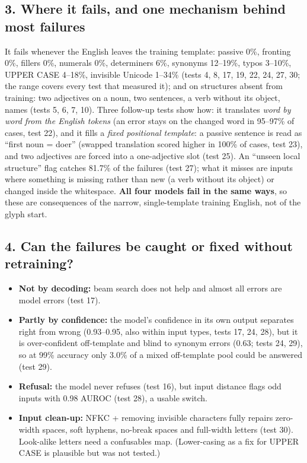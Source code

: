 \documentclass[10pt,a4paper,oneside]{article}
\begin{document}
\subsection*{3. Where it fails, and one mechanism behind most failures}
It fails whenever the English leaves the training template: passive 0\%, fronting 0\%, fillers 0\%, numerals 0\%,
determiners 6\%, synonyms 12--19\%, typos 3--10\%, UPPER CASE 4--18\%, invisible Unicode 1--34\% (tests 4, 8, 17, 19, 22,
24, 27, 30; the range covers every test that measured it);
and on structures absent from training: two adjectives on a noun, two sentences, a verb without its object, names
(tests 5, 6, 7, 10). Three follow-up tests show how: it translates \emph{word by word from the English tokens} (an error
stays on the changed word in 95--97\% of cases, test 22), and it fills a \emph{fixed positional template}: a passive
sentence is read as ``first noun = doer'' (swapped translation scored higher in 100\% of cases, test 23), and two
adjectives are forced into a one-adjective slot (test 25). An ``unseen local structure'' flag catches 81.7\% of the
failures (test 27); what it misses are inputs where something is missing rather than new (a verb without its object)
or changed inside the whitespace. \textbf{All four models fail in the same ways}, so these are consequences of the
narrow, single-template training English, not of the glyph start.

\subsection*{4. Can the failures be caught or fixed without retraining?}
\begin{itemize}
\item \textbf{Not by decoding:} beam search does not help and almost all errors are model errors (test 17).
\item \textbf{Partly by confidence:} the model's confidence in its own output separates right from wrong (0.93--0.95,
also within input types, tests 17, 24, 28), but it is over-confident off-template and blind to synonym errors
(0.63; tests 24, 29), so at 99\% accuracy only 3.0\% of a mixed off-template pool could be answered (test 29).
\item \textbf{Refusal:} the model never refuses (test 16), but input distance flags odd inputs with 0.98 AUROC
(test 28), a usable switch.
\item \textbf{Input clean-up:} NFKC + removing invisible characters fully repairs zero-width spaces, soft hyphens,
no-break spaces and full-width letters (test 30). Look-alike letters need a confusables map. (Lower-casing as a fix
for UPPER CASE is plausible but was not tested.)
\end{itemize}
\end{document}
